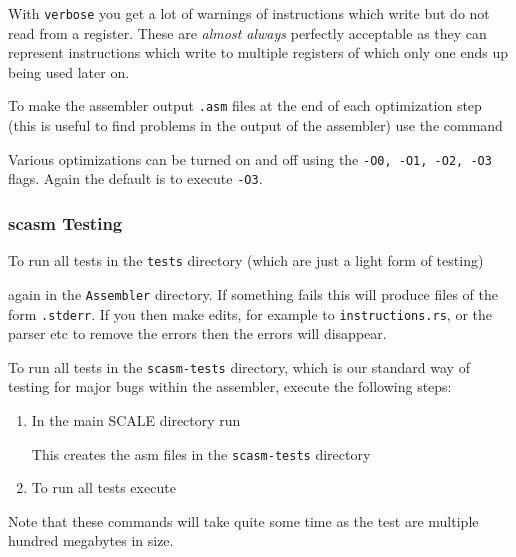 
\noindent With \verb+verbose+ you get a lot of warnings of instructions
which write but do not read from a register. These are {\em almost
always} perfectly acceptable as they can represent instructions
which write to multiple registers of which only one ends up
being used later on.

To make the assembler output \verb+.asm+ files at the end
of each optimization step (this is useful to find problems in the
output of the assembler) use the command


\noindent
Various optimizations can be turned on and off using the 
\verb+-O0, -O1, -O2, -O3+ flags. Again the default is to execute
\verb+-O3+.


\subsubsection{scasm Testing}
To run all tests in the \verb+tests+ directory (which are just a light form of testing)


\noindent again in the \verb+Assembler+ directory.
If something fails this will produce files of the form \verb+.stderr+.
If you then make edits, for example to \verb+instructions.rs+, or the parser etc to remove the
errors then the errors will disappear.

\vspace{5mm}

\noindent To run all tests in the \verb+scasm-tests+ directory, which is our standard way of testing
for major bugs within the assembler, execute the following steps:
\begin{enumerate}
\item In the main SCALE directory run

This creates the asm files in the \verb+scasm-tests+ directory
\item To run all tests execute

\end{enumerate}

Note that these commands will take quite some time as the test are multiple hundred megabytes in size.


